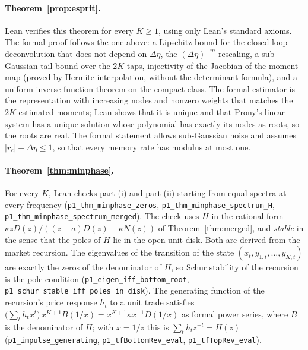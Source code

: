 \documentclass[12pt]{article}
\theoremstyle{definition}
\theoremstyle{remark}
\begin{document}
\paragraph{Theorem~\ref{prop:esprit}.}
Lean verifies this theorem for every $K\ge1$, using only Lean's standard axioms. The formal proof follows the one above: a Lipschitz bound for the closed-loop deconvolution that does not depend on $\Delta\eta$, the $(\Delta\eta)^{-m}$ rescaling, a sub-Gaussian tail bound over the $2K$ taps, injectivity of the Jacobian of the moment map (proved by Hermite interpolation, without the determinant formula), and a uniform inverse function theorem on the compact class. The formal estimator is the representation with increasing nodes and nonzero weights that matches the $2K$ estimated moments; Lean shows that it is unique and that Prony's linear system has a unique solution whose polynomial has exactly its nodes as roots, so the roots are real. The formal statement allows sub-Gaussian noise and assumes $|r_c|+\Delta\eta\le1$, so that every memory rate has modulus at most one.

\paragraph{Theorem~\ref{thm:minphase}.}
For every $K$, Lean checks part (i) and part (ii) starting from equal spectra at every frequency (\texttt{p1\_thm\_minphase\_zeros}, \texttt{p1\_thm\_minphase\_spectrum\_H}, \texttt{p1\_thm\_minphase\_spectrum\_merged}). The check uses $H$ in the rational form $\kappa zD(z)/((z-a)D(z)-\kappa N(z))$ of Theorem~\ref{thm:merged}, and \emph{stable} in the sense that the poles of $H$ lie in the open unit disk. Both are derived from the market recursion. The eigenvalues of the transition of the state $(x_t,y_{1,t},\ldots,y_{K,t})$ are exactly the zeros of the denominator of $H$, so Schur stability of the recursion is the pole condition (\texttt{p1\_eigen\_iff\_bottom\_root}, \texttt{p1\_schur\_stable\_iff\_poles\_in\_disk}). The generating function of the recursion's price response $h_t$ to a unit trade satisfies $\bigl(\sum_th_tx^t\bigr)\,x^{K+1}B(1/x)=x^{K+1}\kappa x^{-1}D(1/x)$ as formal power series, where $B$ is the denominator of $H$; with $x=1/z$ this is $\sum_th_tz^{-t}=H(z)$ (\texttt{p1\_impulse\_generating}, \texttt{p1\_tfBottomRev\_eval}, \texttt{p1\_tfTopRev\_eval}).
\end{document}
